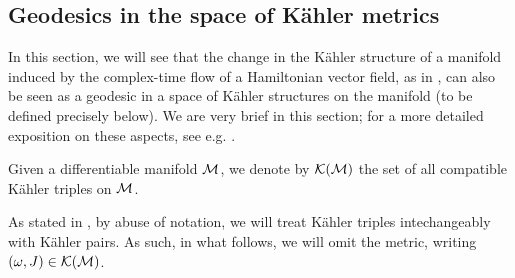 \documentclass[notas.tex]{subfiles}
\begin{document}

\subsection{Geodesics in the space of Kähler metrics} \label{sec_geodesics}

In this section, we will see that the change in the Kähler structure of a manifold induced by the complex-time flow of a Hamiltonian vector field, as in , can also be seen as a geodesic in a space of Kähler structures on the manifold (to be defined precisely below). We are very brief in this section; for a more detailed exposition on these aspects, see e.g. \cite{donaldson_symmetric_1999}.

\begin{defn}
Given a differentiable manifold $\mathcal{M}$, we denote by 	$\mathcal{K}(\mathcal{M})$ the set of all compatible Kähler triples on $\mathcal{M}$.	
\end{defn}

As stated in , by abuse of notation, we will treat Kähler triples intechangeably with Kähler pairs. As such, in what follows, we will omit the metric, writing $(\omega,J) \in \mathcal{K}(\mathcal{M})$.
\end{document}

